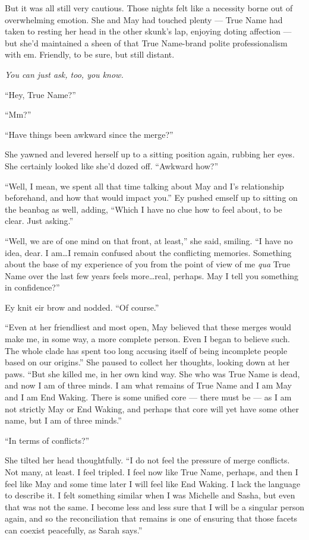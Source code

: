 But it was all still very cautious. Those nights felt like a necessity borne out of overwhelming emotion. She and May had touched plenty — True Name had taken to resting her head in the other skunk's lap, enjoying doting affection — but she'd maintained a sheen of that True Name-brand polite professionalism with em. Friendly, to be sure, but still distant.

\emph{You can just ask, too, you know.}

``Hey, True Name?''

``Mm?''

``Have things been awkward since the merge?''

She yawned and levered herself up to a sitting position again, rubbing her eyes. She certainly looked like she'd dozed off. ``Awkward how?''

``Well, I mean, we spent all that time talking about May and I's relationship beforehand, and how that would impact you.'' Ey pushed emself up to sitting on the beanbag as well, adding, ``Which I have no clue how to feel about, to be clear. Just asking.''

``Well, we are of one mind on that front, at least,'' she said, smiling. ``I have no idea, dear. I am\ldots I remain confused about the conflicting memories. Something about the base of my experience of you from the point of view of me \emph{qua} True Name over the last few years feels more\ldots real, perhaps. May I tell you something in confidence?''

Ey knit eir brow and nodded. ``Of course.''

``Even at her friendliest and most open, May believed that these merges would make me, in some way, a more complete person. Even I began to believe such. The whole clade has spent too long accusing itself of being incomplete people based on our origins.'' She paused to collect her thoughts, looking down at her paws. ``But she killed me, in her own kind way. She who was True Name is dead, and now I am of three minds. I am what remains of True Name and I am May and I am End Waking. There is some unified core — there must be — as I am not strictly May or End Waking, and perhaps that core will yet have some other name, but I am of three minds.''

``In terms of conflicts?''

She tilted her head thoughtfully. ``I do not feel the pressure of merge conflicts. Not many, at least. I feel tripled. I feel now like True Name, perhaps, and then I feel like May and some time later I will feel like End Waking. I lack the language to describe it. I felt something similar when I was Michelle and Sasha, but even that was not the same. I become less and less sure that I will be a singular person again, and so the reconciliation that remains is one of ensuring that those facets can coexist peacefully, as Sarah says.''

